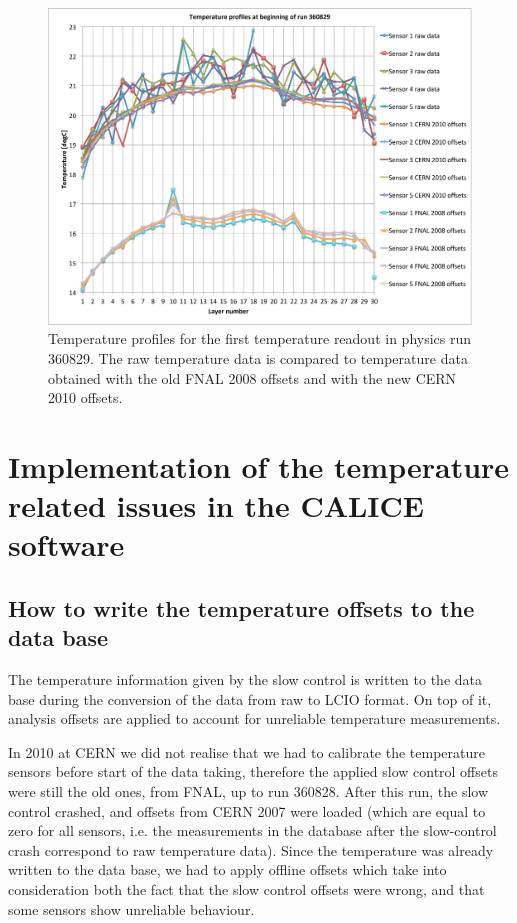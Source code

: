 \documentclass[a4paper,10pt]{article}
\begin{document}
\begin{figure}[t]
\label{fig-temp-profiles-run360829}
\centering
\includegraphics[width=16cm]{temp-profiles-run360829.pdf}
\caption{Temperature profiles for the first temperature readout in 
physics run 360829. The raw temperature data is compared to temperature
data obtained with the old FNAL 2008 offsets and with the new CERN 2010 offsets.}
\end{figure}


\section{Implementation of the temperature related issues in the CALICE software}
\label{offline-implementation}
\subsection{How to write the temperature offsets to the data base}

The temperature information given by the slow control is written to the data base during the conversion of the data from raw to LCIO format.
On top of it, analysis offsets are applied to account for unreliable temperature measurements.

In 2010 at CERN we did not realise that we had to calibrate the temperature sensors before start of the data taking, therefore the applied slow control offsets were still the old ones, from FNAL, up to run 360828. After this run, the slow control crashed, and offsets from CERN 2007 were loaded (which are equal to zero for all sensors, i.e. the measurements in the database
after the slow-control 
crash correspond to raw temperature data). Since the temperature was already written to the data base, we had to apply offline offsets which take into consideration both the fact that the slow control offsets were wrong, and that some sensors show unreliable behaviour.
\end{document}
